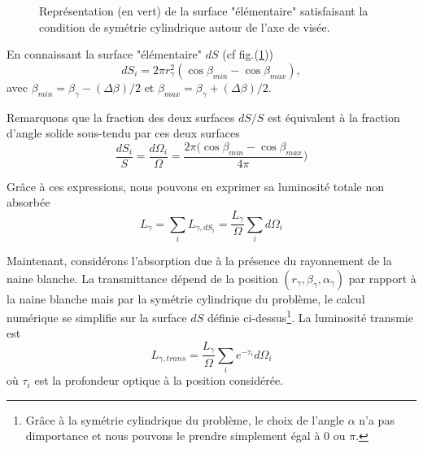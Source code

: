 \documentclass[a4paper,12pt,twoside]{article}
\begin{document}
\begin{figure}[H]
	\centering
    \caption{Représentation (en vert) de la surface "élémentaire" satisfaisant la condition de symétrie cylindrique autour de l'axe de visée.}
    \label{fig: dS}
\end{figure}

En connaissant la surface "élémentaire" $dS$ (cf fig.(\ref{fig: dS}))
\begin{equation*}
	dS_i = 2 \pi r_\gamma^2 (\cos\beta_{min} - \cos\beta_{max}),
\end{equation*}
avec $\beta_{min} = \beta_\gamma - (\Delta \beta)/2$ et $\beta_{max} = \beta_\gamma + (\Delta \beta)/2$.

Remarquons que la fraction des deux surfaces $dS/S$ est équivalent à la fraction d'angle solide sous-tendu par ces deux surfaces
\begin{equation*}
	\frac{dS_i}{S} = \frac{d\Omega_i}{\Omega} = \frac{2\pi(\cos\beta_{min} - \cos\beta_{max}}{4\pi})
\end{equation*}

Grâce à ces expressions, nous pouvons en exprimer sa luminosité totale non absorbée
\begin{equation}
	L_{\gamma} = \sum_i L_{\gamma, dS_i} = \frac{L_\gamma}{\Omega} \sum_i d\Omega_i
\end{equation}
    
Maintenant, considérons l'absorption due à la présence du rayonnement de la naine blanche. La transmittance dépend de la position $(r_\gamma, \beta_\gamma, \alpha_\gamma)$ par rapport à la naine blanche mais par la symétrie cylindrique du problème, le calcul numérique se simplifie sur la surface $dS$ définie ci-dessus\footnote{Grâce à la symétrie cylindrique du problème, le choix de l'angle $\alpha$ n'a pas dimportance et nous pouvons le prendre simplement égal à $0$ ou $\pi$.}. La luminosité transmie est
\begin{equation}
	L_{\gamma, trans} = \frac{L_\gamma}{\Omega} \sum_i e^{-\tau_i} d\Omega_i
\end{equation}
où $\tau_i$ est la profondeur optique à la position considérée.
\end{document}
